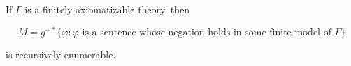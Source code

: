 If $\Gamma$ is a finitely axiomatizable theory, then

$$M = g^{+*} \{ \varphi : \varphi \text{ is a sentence whose negation holds in some finite model of } \Gamma \}$$

is recursively enumerable.
